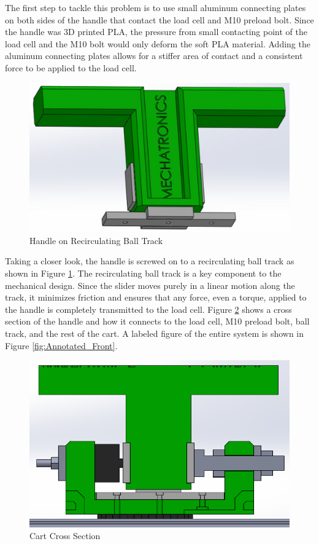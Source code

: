 The first step to tackle this problem is to use small aluminum connecting plates on both sides of the handle that contact the load cell and M10 preload bolt. Since the handle was 3D printed PLA, the pressure from small contacting point of the load cell and the M10 bolt would only deform the soft PLA material. Adding the aluminum connecting plates allows for a stiffer area of contact and a consistent force to be applied to the load cell.

\begin{figure}[H]
	\centering
	\includegraphics[width=1\columnwidth]{Images/Recirculating_Ball_Track}
	\caption{Handle on Recirculating Ball Track}
	\label{fig:Recirculating_Ball_Track}
\end{figure}

Taking a closer look, the handle is screwed on to a recirculating ball track as shown in Figure \ref{fig:Recirculating_Ball_Track}. The recirculating ball track is a key component to the mechanical design. Since the slider moves purely in a linear motion along the track, it minimizes friction and ensures that any force, even a torque, applied to the handle is completely transmitted to the load cell. Figure \ref{fig:Ball_Track_Cross_Section} shows a cross section of the handle and how it connects to the load cell, M10 preload bolt, ball track, and the rest of the cart. A labeled figure of the entire system is shown in Figure \ref{fig:Annotated_Front}.


\begin{figure}[H]
\centering
\includegraphics[width=1\columnwidth]{Images/Ball_Track_Cross_Section}
\caption{Cart Cross Section}
\label{fig:Ball_Track_Cross_Section}
\end{figure}

